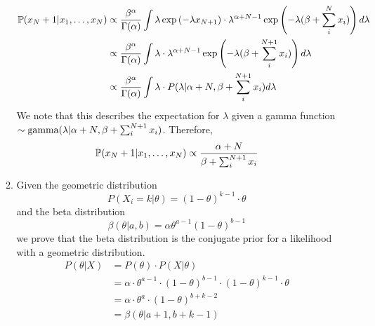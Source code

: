 \documentclass{article}
\begin{document}
\begin{enumerate}
\begin{enumerate}
                \begin{align*}
                    \mathbb{P}(x_N+1|x_1,\hdots,x_N) &\propto \frac{\beta^\alpha}{\Gamma(\alpha)}
                        \int\lambda \exp\left(-\lambda x_{N+1}\right)
                        \cdot\lambda^{\alpha+N-1}\exp\left(-\lambda(\beta+\sum_i^{N}x_i)\right) d\lambda\\
                    &\propto  \frac{\beta^\alpha}{\Gamma(\alpha)} \int\lambda 
                        \cdot\lambda^{\alpha+N-1}\exp\left(-\lambda(\beta+\sum_i^{N+1}x_i)\right) d\lambda\\
                    &\propto  \frac{\beta^\alpha}{\Gamma(\alpha)} \int\lambda 
                        \cdot P(\lambda|\alpha+N,\beta+\sum_i^{N+1}x_i) d\lambda
               \end{align*}                        
                    We note that this describes the expectation for \(\lambda\) given a
                    gamma function \(\sim \textnormal{gamma}(\lambda|\alpha+N, \beta+\sum_i^{N+1}x_i)\).
                    Therefore,
               \begin{equation*}
                   \mathbb{P}(x_N+1|x_1,\hdots,x_N) \propto \frac{\alpha+N}{\beta+\sum_i^{N+1}x_i}
               \end{equation*}                   
            \item %
                Given the geometric distribution
                \begin{equation*}
                    P(X_i=k|\theta)= (1-\theta)^{k-1} \cdot \theta
                \end{equation*}
                and the beta distribution
                \begin{equation*}
                    \beta(\theta|a,b)= \alpha \theta^{a-1} (1-\theta)^{b-1}
                \end{equation*}
                we prove that the beta distribution is the conjugate prior
                for a likelihood with a geometric distribution.
                \begin{align*}
                    P(\theta|X)
                    &= P(\theta) \cdot P(X|\theta) \\
                    &= \alpha \cdot \theta^{a-1} \cdot (1-\theta)^{b-1} 
                        \cdot (1-\theta)^{k-1} \cdot \theta \\
                    &= \alpha \cdot \theta^{a} \cdot (1-\theta)^{b+k-2} \\
                    &= \beta(\theta|a+1, b+k-1) 

\end{align*}
\end{enumerate}
\end{enumerate}
\end{document}
